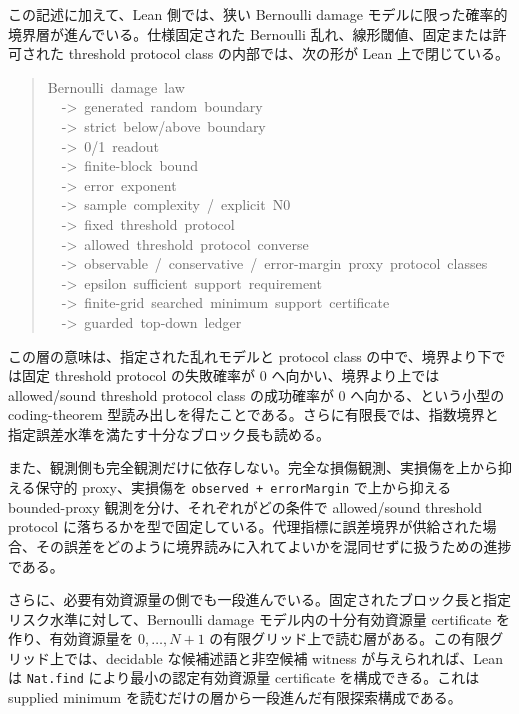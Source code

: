 \documentclass[12pt,a4paper]{article}
\begin{document}
この記述に加えて、Lean 側では、狭い Bernoulli damage モデルに限った確率的境界層が進んでいる。仕様固定された Bernoulli 乱れ、線形閾値、固定または許可された threshold protocol class の内部では、次の形が Lean 上で閉じている。

\begin{quote}
{\small\ttfamily\noindent
Bernoulli~damage~law \\~~->~generated~random~boundary \\~~->~strict~below/above~boundary \\~~->~0/1~readout \\~~->~finite-block~bound \\~~->~error~exponent \\~~->~sample~complexity~/~explicit~N0 \\~~->~fixed~threshold~protocol \\~~->~allowed~threshold~protocol~converse \\~~->~observable~/~conservative~/~error-margin~proxy~protocol~classes \\~~->~epsilon~sufficient~support~requirement \\~~->~finite-grid~searched~minimum~support~certificate \\~~->~guarded~top-down~ledger
}
\end{quote}

この層の意味は、指定された乱れモデルと protocol class の中で、境界より下では固定 threshold protocol の失敗確率が 0 へ向かい、境界より上では allowed/sound threshold protocol class の成功確率が 0 へ向かる、という小型の coding-theorem 型読み出しを得たことである。さらに有限長では、指数境界と指定誤差水準を満たす十分なブロック長も読める。

また、観測側も完全観測だけに依存しない。完全な損傷観測、実損傷を上から抑える保守的 proxy、実損傷を \texttt{observed\ +\ errorMargin} で上から抑える bounded-proxy 観測を分け、それぞれがどの条件で allowed/sound threshold protocol に落ちるかを型で固定している。代理指標に誤差境界が供給された場合、その誤差をどのように境界読みに入れてよいかを混同せずに扱うための進捗である。

さらに、必要有効資源量の側でも一段進んでいる。固定されたブロック長と指定リスク水準に対して、Bernoulli damage モデル内の十分有効資源量 certificate を作り、有効資源量を \(0,\ldots,N+1\) の有限グリッド上で読む層がある。この有限グリッド上では、decidable な候補述語と非空候補 witness が与えられれば、Lean は \texttt{Nat.find} により最小の認定有効資源量 certificate を構成できる。これは supplied minimum を読むだけの層から一段進んだ有限探索構成である。
\end{document}
